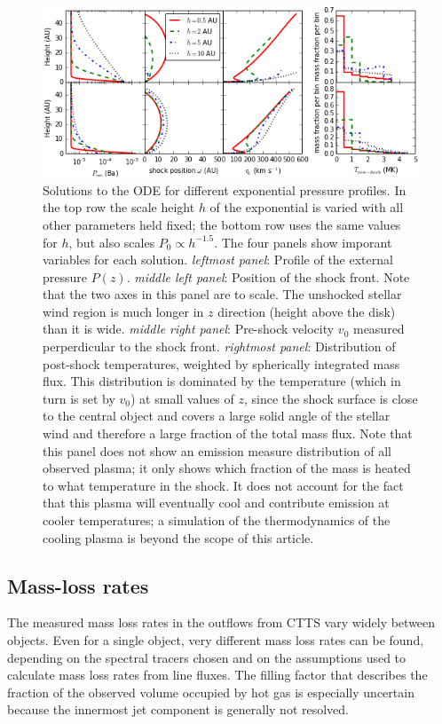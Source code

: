 \documentclass[manuscript]{aastex}
\begin{document}
\begin{figure}[h!]
\begin{center}
\includegraphics[width=1\columnwidth]{figures/P_ext/P_ext.png}
\caption{\label{fig:p_ext}
Solutions to the ODE for different exponential pressure profiles. In the top row the scale height $h$ of the exponential is varied with all other parameters held fixed; the bottom row uses the same values for $h$, but also scales $P_0\propto h^{-1.5}$.
The four panels show imporant variables for each solution. 
\emph{leftmost panel}: Profile of the external pressure $P(z)$. 
\emph{middle left panel}: Position of the shock front. Note that the two axes in this panel are to scale. The unshocked stellar wind region is much longer in $z$ direction (height above the disk) than it is wide. 
\emph{middle right panel}: Pre-shock velocity $v_0$ measured perperdicular to the shock front. 
\emph{rightmost panel}: Distribution of post-shock temperatures, weighted by spherically integrated mass flux. This distribution is dominated by the temperature (which in turn is set by $v_0$) at small values of $z$, since the shock surface is close to the central object and covers a large solid angle of the stellar wind and therefore a large fraction of the total mass flux. Note that this panel does not show an emission measure distribution of all observed plasma; it only shows which fraction of the mass is heated to what temperature in the shock. It does not account for the fact that this plasma will eventually cool and contribute emission at cooler temperatures; a simulation of the thermodynamics of the cooling plasma is beyond the scope of this article.}
\end{center}
\end{figure}

\subsection{Mass-loss rates}
The measured mass loss rates in the outflows from CTTS vary widely between objects.  Even for a single object, very different mass loss rates can be found, depending on the spectral tracers chosen and on the assumptions used to calculate mass loss rates from line fluxes. The filling factor that describes the fraction of the observed volume occupied by hot gas is especially uncertain because the innermost jet component is generally not resolved.
\end{document}
